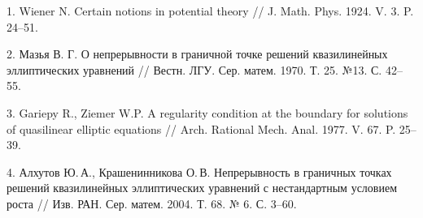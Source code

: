 1. Wiener N. Certain notions in potential theory // J. Math. Phys. 1924. V. 3. P. 24--51.


2. Мазья В. Г. О непрерывности в граничной точке решений квазилинейных эллиптических
уравнений // Вестн. ЛГУ. Сер. матем. 1970. Т. 25. №13. С. 42--55.


3. Gariepy R., Ziemer W.P. A regularity condition at the boundary for solutions of quasilinear
elliptic equations // Arch. Rational Mech. Anal. 1977. V. 67. P. 25--39.


4. Алхутов Ю.\,А., Крашенинникова О.\,В.
Непрерывность в граничных точках решений квазилинейных эл\-ли\-п\-ти\-че\-с\-ких уравнений с нестандартным условием роста
//
Изв.
\linebreak
РАН. Сер. матем. 2004. Т. 68. № 6. С. 3–60.
